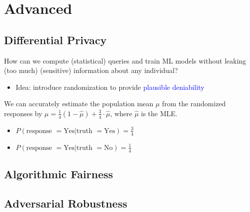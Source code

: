 \documentclass[a4paper,10pt,twoside=true,DIV=10,headsepline,plainheadsepline]{scrartcl}
\begin{document}
		
	\section{Advanced}
	\subsection{Differential Privacy}
	How can we compute (statistical) queries and train ML models without leaking (too much) (sensitive) information about any individual?
	\begin{itemize}
 		\item Idea: introduce randomization to provide \textcolor{blue}{plausible deniability}
	\end{itemize}
	
	\begin{center}
	\end{center}

	We can accurately estimate the population mean $\mu$ from the randomized responses by $\mu = \frac{1}{4} (1 − \hat{\mu}) + \frac{3}{4} \cdot \hat{\mu}$, where $\hat{\mu}$ is the MLE.
	\begin{itemize}
 		\item $P ( \textrm{response } = \textrm{Yes} | \textrm{truth } = \textrm{Yes}) =  \frac{3}{4}$
		\item $P ( \textrm{response } = \textrm{Yes} | \textrm{truth } = \textrm{No}) =  \frac{1}{4}$
	\end{itemize}


	\subsection{Algorithmic Fairness}

	\subsection{Adversarial Robustness}
\end{document}
